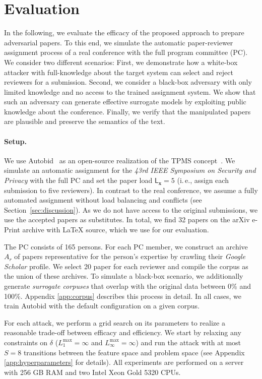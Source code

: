 \documentclass[letterpaper,twocolumn,10pt]{article}
\newcommand{\ie}{i.\,e.}
\newcommand{\bow}{\textbf{x}}
\newcommand{\submission}{\bow}
\newcommand{\reviewer}{r}
\newcommand{\archive}{A}
\newcommand{\paperload}{\mathsf{L}_{\submission}}
\newcommand{\switches}{S}
\newcommand{\modifications}{\delta}
\newcommand{\maxmannorm}{L_1^\text{max}}
\newcommand{\maxinfnorm}{L_\infty^\text{max}}
\begin{document}
\section{Evaluation}
\label{sec:evaluation}

In the following, we evaluate the efficacy of the proposed approach to prepare adversarial papers. To this end, we simulate the automatic paper-reviewer assignment process of a real conference with the full program committee (PC). 
We consider two different scenarios:
First, we demonstrate how a white-box attacker with full-knowledge about the target system can select and reject reviewers for a submission.
Second, we consider a black-box adversary with only limited knowledge and no access to the trained assignment system. We show that such an adversary can generate effective surrogate models by exploiting public knowledge about the conference.
Finally, we verify that the manipulated papers are plausible and preserve the semantics of the text.

\paragraph{Setup.} 
We use Autobid~\cite{misc-autobid} as an open-source realization of the TPMS concept~\cite{charlin-13-toronto}. We simulate an automatic assignment for the \emph{43rd IEEE Symposium on Security and Privacy} with the full PC and set the paper load $\paperload = 5$ (\ie, assign each submission to five reviewers). In contrast to the real conference, we assume a fully automated assignment without load balancing and conflicts (see Section~\ref{sec:discussion}).
As we do not have access to the original submissions, we use the accepted papers as substitutes. In total, we find 32 papers on the arXiv e-Print archive with \LaTeX{} source, which we use for our evaluation.

The PC consists of 165 persons. For each PC member, we construct an archive $\archive_\reviewer$ of papers representative for the person's expertise by crawling their \emph{Google Scholar} profile. We select 20 paper for each reviewer and compile the corpus as the union of these archives. To simulate a black-box scenario, we additionally generate \emph{surrogate corpuses} that overlap with the original data between 0\%  and 100\%. Appendix \ref{app:corpus} describes this process in detail. In all cases, we train Autobid with the default configuration on a given corpus.

For each attack, we perform a grid search on its parameters to realize a reasonable trade-off between efficacy and efficiency. We start by relaxing any constraints on $\modifications$ ($\maxmannorm = \infty$ and $\maxinfnorm = \infty$) and run the attack with at most $\switches = 8$ transitions between the feature space and problem space (see Appendix \ref{app:hyperparameters} for details).
All experiments are performed on a server with 256 GB RAM and two Intel Xeon Gold 5320 CPUs. 
\end{document}
